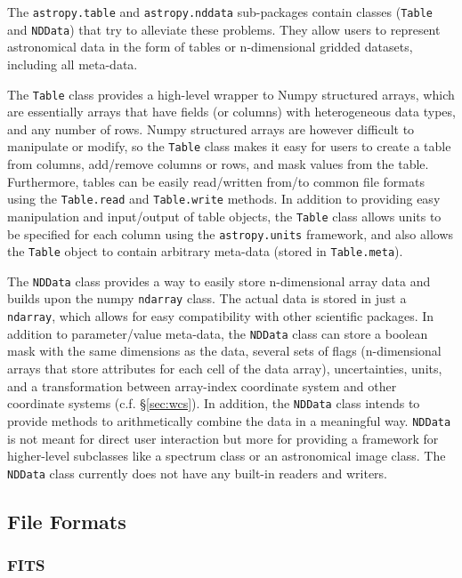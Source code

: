 \documentclass[traditabstract]{aa}
\begin{document}
The \texttt{astropy.table} and \texttt{astropy.nddata} sub-packages contain
classes (\texttt{Table} and \texttt{NDData}) that try to alleviate these problems.
They allow users to represent astronomical data in the form of tables or
n-dimensional gridded datasets, including all meta-data.

The \texttt{Table} class provides a high-level wrapper to Numpy structured
arrays, which are essentially arrays that have fields (or columns) with
heterogeneous data types, and any number of rows. Numpy structured arrays are
however difficult to manipulate or modify, so the \texttt{Table} class makes
it easy for users to create a table from columns, add/remove columns or rows,
and mask values from the table. Furthermore, tables can be easily read/written
from/to common file formats using the \texttt{Table.read} and
\texttt{Table.write} methods. In addition to providing easy manipulation and
input/output of table objects, the \texttt{Table} class allows units to be
specified for each column using the \texttt{astropy.units} framework, and also
allows the \texttt{Table} object to contain arbitrary meta-data (stored in
\texttt{Table.meta}).

The \texttt{NDData} class provides a way to easily store n-dimensional array
data and builds upon the \gls{numpy} \texttt{ndarray} class. The actual data
is stored in just a \texttt{ndarray}, which allows for easy compatibility with
other scientific packages. In addition to parameter/value meta-data, the
\texttt{NDData} class can store a boolean mask with the same dimensions as the
data, several sets of flags (n-dimensional arrays that store attributes for
each cell of the data array), uncertainties, units, and a transformation
between array-index coordinate system and other coordinate systems (c.f.
\S\ref{sec:wcs}). In addition, the \texttt{NDData} class intends to provide
methods to arithmetically combine the data in a meaningful way.
\texttt{NDData} is not meant for direct user interaction but more for
providing a framework for higher-level subclasses like a spectrum class or an
astronomical image class. The \texttt{NDData} class currently does not have any built-in readers
and writers.

\subsection{File Formats}


\subsubsection{FITS}
\end{document}
